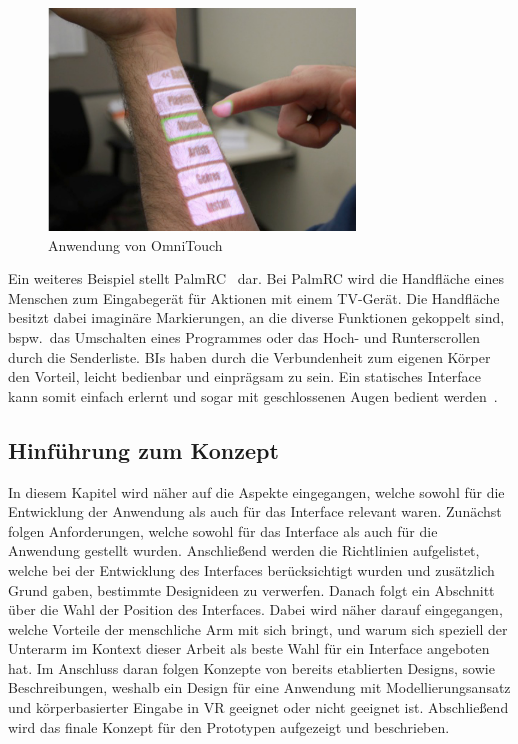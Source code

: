 \begin{figure}[h]
\captionsetup{width=.7\linewidth}
\includegraphics[scale=1]{Bilder/Hauptteil/onbodyinterface}
\centering
\caption{Anwendung von OmniTouch~\cite[p.~446]{omnitouch}}
\label{fig:omnitouch}
\end{figure}

\noindent Ein weiteres Beispiel stellt PalmRC~\cite{palmrc} dar. Bei PalmRC wird die Handfläche eines Menschen zum Eingabegerät für Aktionen mit einem TV-Gerät. Die Handfläche besitzt dabei imaginäre Markierungen, an die diverse Funktionen gekoppelt sind, bspw.~das Umschalten eines Programmes oder das Hoch- und Runterscrollen durch die Senderliste. BIs haben durch die Verbundenheit zum eigenen Körper den Vorteil, leicht bedienbar und einprägsam zu sein. Ein statisches Interface kann somit einfach erlernt und sogar mit geschlossenen Augen bedient werden~\cite{implicationsoflocation}.

\subsection{Hinführung zum Konzept}
In diesem Kapitel wird näher auf die Aspekte eingegangen, welche sowohl für die Entwicklung der Anwendung als auch für das Interface relevant waren. Zunächst folgen Anforderungen, welche sowohl für das Interface als auch für die Anwendung gestellt wurden. Anschließend werden die Richtlinien aufgelistet, welche bei der Entwicklung des Interfaces berücksichtigt wurden und zusätzlich Grund gaben, bestimmte Designideen zu verwerfen. Danach folgt ein Abschnitt über die Wahl der Position des Interfaces. Dabei wird näher darauf eingegangen, welche Vorteile der menschliche Arm mit sich bringt, und warum sich speziell der Unterarm im Kontext dieser Arbeit als beste Wahl für ein Interface angeboten hat. Im Anschluss daran folgen Konzepte von bereits etablierten Designs, sowie Beschreibungen, weshalb ein Design für eine Anwendung mit Modellierungsansatz und körperbasierter Eingabe in VR geeignet oder nicht geeignet ist. Abschließend wird das finale Konzept für den Prototypen aufgezeigt und beschrieben.

